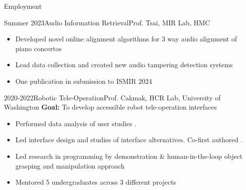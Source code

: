 \documentclass[]{mcdowellcv}
\begin{document}
\begin{cvsection}{Employment}
\begin{cvsubsection}{Summer 2023}{Audio Information Retrieval}{Prof. Tsai, MIR Lab, HMC}
\begin{itemize}
			\item Developed novel online alignment algorithms for 3 way audio alignment of piano concertos
			\item Lead data collection and created new audio tampering detection systems
			\item One publication in submission to ISMIR 2024
		\end{itemize}
	\end{cvsubsection}
	\begin{cvsubsection}{2020-2022}{Robotic Tele-Operation}{Prof. Cakmak, HCR Lab, University of Washington}
		\textbf{Goal:} To develop accessible robot tele-operation interfaces
		\begin{itemize}
			\item Performed data analysis of user studies .
			\item Led interface design and studies of interface alternatives. Co-first authored  .
			\item Led research in programming by demonstration \& human-in-the-loop object grasping and manipulation approach
			\item Mentored 5 undergraduates across 3 different projects
		\end{itemize}
	\end{cvsubsection}
\end{cvsection}
\end{document}
